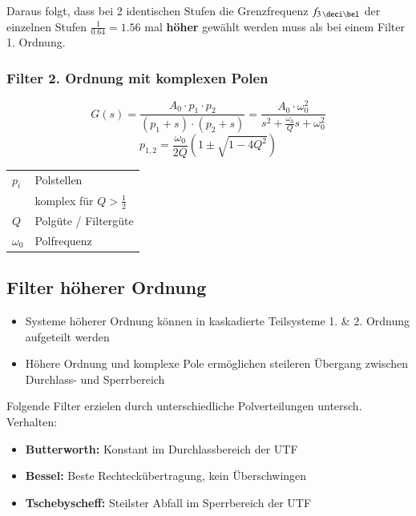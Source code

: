 Daraus folgt, dass bei 2 identischen Stufen die Grenzfrequenz $f_{3 \, \deci \bel}$ der einzelnen Stufen $\frac{1}{0.64} = 1.56$ mal 
\textbf{höher} gewählt werden muss als bei einem Filter 1. Ordnung.


\subsubsection{Filter 2. Ordnung mit komplexen Polen}

\begin{minipage}[c]{0.6\columnwidth}
    $$ G(s) = \frac{A_0 \cdot p_1 \cdot p_2}{(p_1 + s) \cdot (p_2 + s)} = \frac{A_0 \cdot \omega_0^2}{s^2 + \frac{\omega_0}{Q} s + \omega_0^2} $$
$$ p_{1,2} = \frac{\omega_0}{2 Q} (1 \pm \sqrt{1 - 4 Q^2}) $$
\end{minipage}
\hfill
\begin{minipage}[c]{0.38\columnwidth}
    \begin{tabular}{ll}
        $p_i$       & Polstellen \\
                    & komplex für $Q > \frac{1}{2}$ \\
        $Q$         & Polgüte / Filtergüte \\
        $\omega_0$  & Polfrequenz
    \end{tabular}
\end{minipage}



\subsection{Filter höherer Ordnung}

\begin{itemize}
    \item Systeme höherer Ordnung können in kaskadierte Teilsysteme 1. \& 2. Ordnung aufgeteilt werden
    \item Höhere Ordnung und komplexe Pole ermöglichen steileren Übergang zwischen Durchlass- und Sperrbereich
\end{itemize}

Folgende Filter erzielen durch unterschiedliche Polverteilungen untersch. Verhalten:

\begin{itemize}
    \item \textbf{Butterworth:} Konstant im Durchlassbereich der UTF
    \item \textbf{Bessel:} Beste Rechteckübertragung, kein Überschwingen
    \item \textbf{Tschebyscheff:} Steilster Abfall im Sperrbereich der UTF
\end{itemize}


